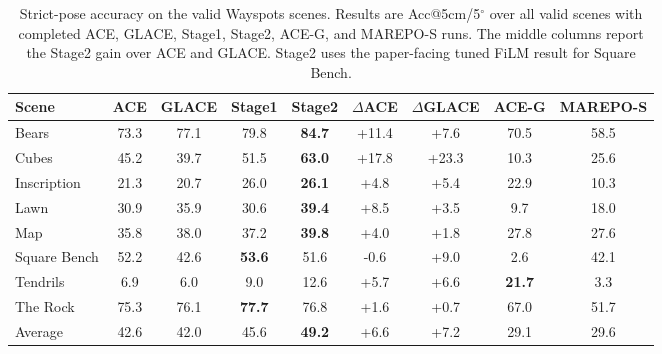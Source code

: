 \begin{table}[t]
\centering
\small
\setlength{\tabcolsep}{4.3pt}
\renewcommand{\arraystretch}{1.08}
\caption{Strict-pose accuracy on the valid Wayspots scenes. Results are Acc@5cm/5$^\circ$ over all valid scenes with completed ACE, GLACE, Stage1, Stage2, ACE-G, and MAREPO-S runs. The middle columns report the Stage2 gain over ACE and GLACE. Stage2 uses the paper-facing tuned FiLM result for Square Bench.}
\label{tab:wayspots_acc5_selected}
\begin{tabular*}{\textwidth}{@{\extracolsep{\fill}}lcccccccc@{}}
\toprule
Scene & ACE & GLACE & Stage1 & Stage2 & $\Delta$ACE & $\Delta$GLACE & ACE-G & MAREPO-S \\
\midrule
Bears & 73.3 & 77.1 & 79.8 & \textbf{84.7} & +11.4 & +7.6 & 70.5 & 58.5 \\
Cubes & 45.2 & 39.7 & 51.5 & \textbf{63.0} & +17.8 & +23.3 & 10.3 & 25.6 \\
Inscription & 21.3 & 20.7 & 26.0 & \textbf{26.1} & +4.8 & +5.4 & 22.9 & 10.3 \\
Lawn & 30.9 & 35.9 & 30.6 & \textbf{39.4} & +8.5 & +3.5 & 9.7 & 18.0 \\
Map & 35.8 & 38.0 & 37.2 & \textbf{39.8} & +4.0 & +1.8 & 27.8 & 27.6 \\
Square Bench & 52.2 & 42.6 & \textbf{53.6} & 51.6 & -0.6 & +9.0 & 2.6 & 42.1 \\
Tendrils & 6.9 & 6.0 & 9.0 & 12.6 & +5.7 & +6.6 & \textbf{21.7} & 3.3 \\
The Rock & 75.3 & 76.1 & \textbf{77.7} & 76.8 & +1.6 & +0.7 & 67.0 & 51.7 \\
\midrule
Average & 42.6 & 42.0 & 45.6 & \textbf{49.2} & +6.6 & +7.2 & 29.1 & 29.6 \\
\bottomrule
\end{tabular*}
\end{table}
